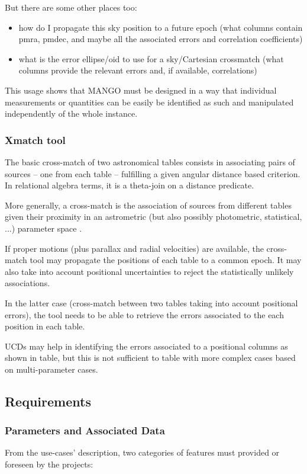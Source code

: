 \documentclass[11pt,a4paper]{ivoa}
\begin{document}
\begin{itemize}
But there are some other places too:
\begin{itemize}
    \item how do I propagate this sky position to a future epoch
    (what columns contain pmra, pmdec, and maybe all the
     associated errors and correlation coefficients)

    \item what is the error ellipse/oid to use for a sky/Cartesian crossmatch
    (what columns provide the relevant errors and, if available,
     correlations)
\end{itemize}

This usage shows that MANGO must be designed in a way that individual measurements or quantities can be easily be identified as such and manipulated independently of the whole instance.

\subsubsection{Xmatch tool }
The basic cross-match of two astronomical tables consists in associating pairs of sources -- one 
from each table -- fulfilling a given angular distance based criterion.
In relational algebra terms, it is a theta-join on a distance predicate.

More generally, a cross-match is the association of sources from different tables given their 
proximity in an astrometric (but also possibly photometric, statistical, ...) parameter space \citep{2017A&A...597A..89P} .

If proper motions (plus parallax and radial velocities) are available, the cross-match tool 
may propagate the positions of each table to a common epoch.
It may also take into account positional uncertainties to reject the statistically unlikely associations.

In the latter case (cross-match between two tables taking into account positional errors),
the tool needs to be able to retrieve the errors associated to the each position in each table.

UCDs may help in identifying the errors associated to a positional columns as shown in 
table, but this is not sufficient to table with more complex cases based on multi-parameter cases.

\subsection{Requirements}

\subsubsection{Parameters and Associated Data}
From the use-cases' description, two categories of features must provided or foreseen by the projects:


\end{itemize}
\end{document}

